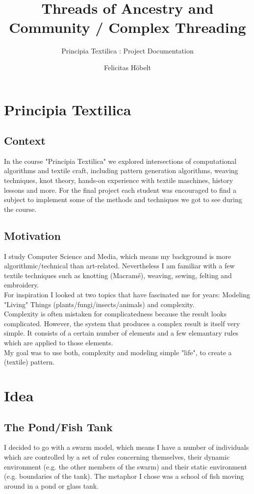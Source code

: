 \documentclass{scrartcl}
\title{Threads of Ancestry and Community / Complex Threading}
\subtitle{Principia Textilica : Project Documentation}
\author{Felicitas Höbelt}
\begin{document}
\maketitle

\section{Principia Textilica}

\subsection{Context}
In the course "Principia Textilica" we explored intersections of computational algorithms and textile craft, including pattern generation algorithms, weaving techniques, knot theory, hands-on experience with textile maschines, history lessons and more.
For the final project each student was encouraged to find a subject to implement some of the methods and techniques we got to see during the course.

\subsection{Motivation}

I study Computer Science and Media, which means my background is more algorithmic/technical than art-related.
Nevertheless I am familiar with a few textile techniques such as knotting (Macramé), weaving, sewing, felting and embroidery.\\
For inspiration I looked at two topics that have fascinated me for years: Modeling "Living" Things (plants/fungi/insects/animals) and complexity.\\
Complexity is often mistaken for complicatedness because the result looks complicated.
However, the system that produces a complex result is itself very simple. It consists of a certain number of elements and a few elemantary rules which are applied to those elements.\\
My goal was to use both, complexity and modeling simple "life", to create a (textile) pattern.

\section{Idea}

\subsection{The Pond/Fish Tank}
I decided to go with a swarm model, which means I have a number of individuals which are controlled by a set of rules concerning themselves, their dynamic environment (e.g. the other members of the swarm) and their static environment (e.g. boundaries of the tank).
The metaphor I chose was a school of fish moving around in a pond or glass tank.
\end{document}
